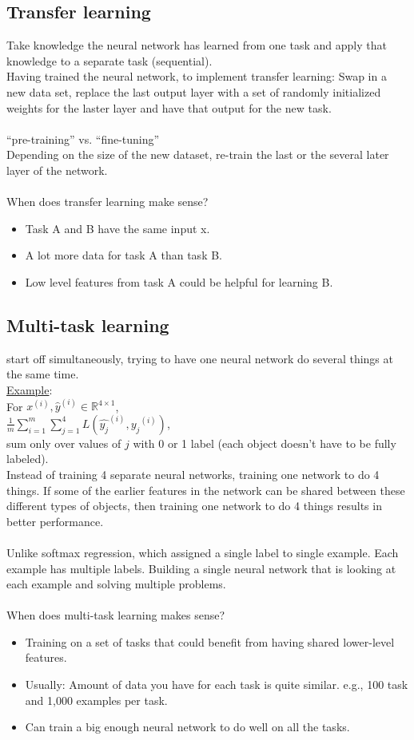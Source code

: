\subsection{Transfer learning}
Take knowledge the neural network has learned from one task and apply that knowledge to a separate task (sequential).\\
Having trained the neural network, to implement transfer learning: Swap in a new data set, replace the last output layer with a set of randomly initialized weights for the laster layer and have that output for the new task.\\
\\
``pre-training'' vs. ``fine-tuning''\\
Depending on the size of the new dataset, re-train the last or the several later layer of the network.\\
\\
When does transfer learning make sense?
\begin{itemize}
\item
Task A and B have the same input x.
\item
A lot more data for task A than task B.
\item
Low level features from task A could be helpful for learning B.
\end{itemize}

%
\subsection{Multi-task learning}
start off simultaneously, trying to have one neural network do several things at the same time.\\
\underline{Example}:\\
For $x^{(i)}, \hat{y}^{(i)} \in \mathbb{R}^{4 \times 1}$,\\
$\displaystyle\frac{1}{m}\sum_{i=1}^{m}\sum_{j=1}^{4}L(\hat{y_{j}}^{(i)}, {y_{j}}^{(i)})$, \\sum only over values of $j$ with 0 or 1 label (each object doesn't have to be fully labeled).\\
Instead of training 4 separate neural networks, training one network to do 4 things. If some of the earlier features in the network can be shared between these different types of objects, then training one network to do 4 things results in better performance.\\
\\
Unlike softmax regression, which assigned a single label to single example. Each example has multiple labels. Building a single neural network that is looking at each example and solving multiple problems.\\
\\
When does multi-task learning makes sense?
\begin{itemize}
\item
Training on a set of tasks that could benefit from having shared lower-level features.
\item
Usually: Amount of data you have for each task is quite similar. e.g., 100 task and 1,000 examples per task.
\item
Can train a big enough neural network to do well on all the tasks.
\end{itemize}

